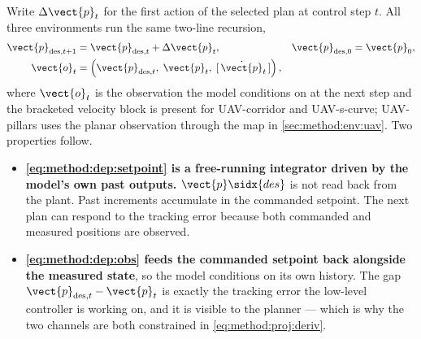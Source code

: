 Write $\Delta\vect{p}_{t}$ for the first action of the selected plan at control step $t$. All three
environments run the same two-line recursion,
\begin{align}
  \vect{p}_{\textrm{des},t+1} &= \vect{p}_{\textrm{des},t} + \Delta\vect{p}_{t},
    &&\vect{p}_{\textrm{des},0} = \vect{p}_{0},
    \label{eq:method:dep:setpoint}\\
  \vect{o}_{t} &= \left(\vect{p}_{\textrm{des},t},\;\vect{p}_{t},\;[\,\dot{\vect{p}}_{t}\,]\right),
    \label{eq:method:dep:obs}
\end{align}
where $\vect{o}_{t}$ is the observation the model conditions on at the next step and the bracketed
velocity block is present for UAV-corridor and UAV-s-curve; UAV-pillars uses the planar
observation through the map in \autoref{sec:method:env:uav}. Two properties follow.

\begin{itemize}
  \item \textbf{\eqref{eq:method:dep:setpoint} is a free-running integrator driven by the model's own
    past outputs.} $\vect{p}\sidx{des}$ is not read back from the plant. Past increments accumulate in the commanded setpoint. The next plan can respond to the
    tracking error because both commanded and measured positions are observed.
  \item \textbf{\eqref{eq:method:dep:obs} feeds the commanded setpoint back alongside the measured
    state}, so the model conditions on its own history. The gap
    $\vect{p}_{\textrm{des},t} - \vect{p}_{t}$ is exactly the tracking error the low-level controller is
    working on, and it is visible to the planner --- which is why the two channels are both
    constrained in \eqref{eq:method:proj:deriv}.
\end{itemize}

